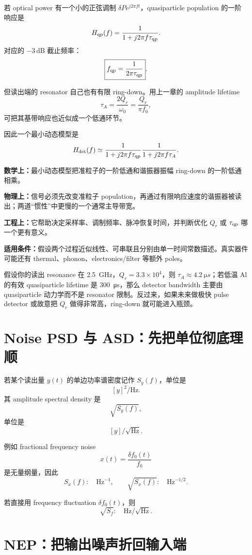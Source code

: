 \documentclass[11pt,a4paper,openany]{ctexrep}
\newcommand{\formulaexplain}[4]{%
\begin{formulaguidebox}
\textbf{\color{KidBlue}数学上：}#1\par
\textbf{\color{KidTeal}物理上：}#2\par
\textbf{\color{KidGold!55!black}工程上：}#3\par
\textbf{\color{KidRed}适用条件：}#4
\end{formulaguidebox}%
}
\begin{document}
若 optical power 有一个小的正弦调制 $\delta P e^{j2\pi ft}$，quasiparticle population 的一阶响应是
\[
H_{\rm qp}(f)=\frac{1}{1+j2\pi f\tau_{\rm qp}}.
\]
对应的 $-3\,\mathrm{dB}$ 截止频率：
\[
\boxed{f_{\rm qp}=\frac{1}{2\pi\tau_{\rm qp}}}.
\]

但读出端的 resonator 自己也有有限 ring-down。用上一章的 amplitude lifetime
\[
\tau_A=\frac{2Q_r}{\omega_0}
=\frac{Q_r}{\pi f_0},
\]
可把其基带响应也近似成一个低通环节。

因此一个最小动态模型是
\[
H_{\rm det}(f)
\simeq
\frac{1}{1+j2\pi f\tau_{\rm qp}}
\frac{1}{1+j2\pi f\tau_A}.
\]
\formulaexplain
{最小动态模型把准粒子的一阶低通和谐振器振幅 ring-down 的一阶低通相乘。}
{信号必须先改变准粒子 population，再通过有限响应速度的谐振器被读出；两道“惯性”中更慢的一个通常主导带宽。}
{它帮助决定采样率、调制频率、脉冲恢复时间，并判断优化 $Q_r$ 或 $\tau_{\rm qp}$ 哪一个更有意义。}
{假设两个过程近似线性、可串联且分别由单一时间常数描述。真实器件可能还有 thermal、phonon、electronics/filter 等额外 poles。}

\begin{projectbox}
假设你的读出 resonance 在 \SI{2.5}{GHz}，$Q_r=3.3\times10^4$，则 $\tau_A\approx\SI{4.2}{\micro s}$；若低温 Al 的有效 quasiparticle lifetime 是 \SI{300}{\micro s}，那么 detector bandwidth 主要由 quasiparticle 动力学而不是 resonator 限制。反过来，如果未来做极快 pulse detector 或故意把 $Q_r$ 做得非常高，ring-down 就可能进入瓶颈。
\end{projectbox}

\section{Noise PSD 与 ASD：先把单位彻底理顺}

若某个读出量 $y(t)$ 的单边功率谱密度记作 $S_y(f)$，单位是
\[
[y]^2/\mathrm{Hz}.
\]
其 amplitude spectral density 是
\[
\sqrt{S_y(f)},
\]
单位是
\[
[y]/\sqrt{\mathrm{Hz}}.
\]

例如 fractional frequency noise
\[
x(t)=\frac{\delta f_0(t)}{f_0}
\]
是无量纲量，因此
\[
S_x(f):\quad \mathrm{Hz}^{-1},
\qquad
\sqrt{S_x(f)}:\quad \mathrm{Hz}^{-1/2}.
\]

若直接用 frequency fluctuation $\delta f_0(t)$，则
\[
\sqrt{S_f}:\quad \mathrm{Hz}/\sqrt{\mathrm{Hz}}.
\]

\section{NEP：把输出噪声折回输入端}
\end{document}

